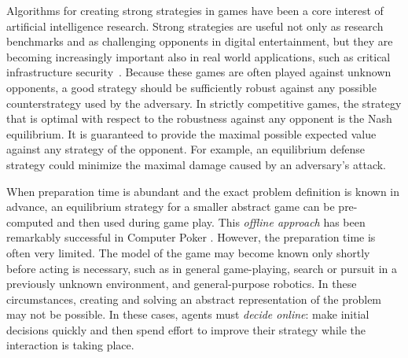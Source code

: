 \documentclass{aamas2015}
\newcounter{mlNoteCounter}
\newcommand{\mlnote}[1]{{\scriptsize \color{darkgreen} $\blacksquare$ \refstepcounter{mlNoteCounter}\textsf{[ML]$_{\arabic{mlNoteCounter}}$:{#1}}}}
\renewcommand{\mlnote}[1]{}
\begin{document}
Algorithms for creating strong strategies in games have been a core interest of artificial intelligence research. Strong strategies are useful not only as research benchmarks and as challenging opponents in digital entertainment, but they are becoming increasingly important also in real world applications, such as critical infrastructure security~\cite{Tambe11}.
Because these games are often played against unknown opponents, a good strategy should be sufficiently robust against any possible counterstrategy used by the adversary. In strictly competitive games, the strategy that is optimal with respect to the robustness against any opponent is the Nash equilibrium. It is guaranteed to provide the maximal possible expected value against any strategy of the opponent. For example, an equilibrium defense strategy could minimize the maximal damage caused by an adversary's attack.

When preparation time is abundant and the exact problem definition is known in advance, an equilibrium strategy for a smaller abstract game can be pre-computed and 
then used during game play. This {\it offline approach} has been remarkably successful in 
Computer Poker \cite{Johanson07Msc,Gilpin09,Sandholm10The,Rubin11Poker,Johanson13Evaluating}. 
However, the preparation time is often very limited. The model of the game may become known only shortly before acting is necessary, such as in general game-playing, search or pursuit in a previously unknown environment, and general-purpose robotics. In these circumstances, creating and solving an abstract representation of the problem may not be possible. In these cases, agents must {\it decide online}: make initial decisions quickly and then spend effort to improve their strategy while the interaction is taking place.
\end{document}
